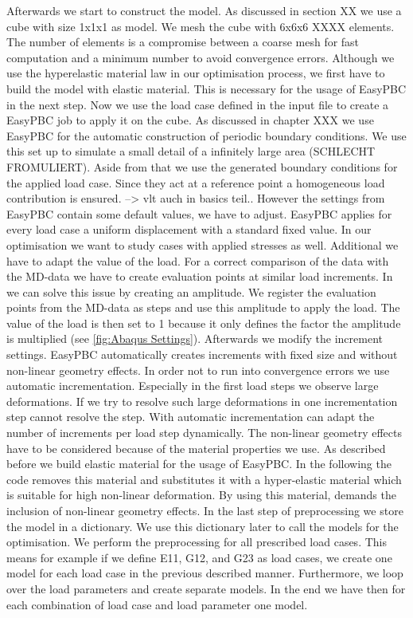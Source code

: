 Afterwards we start to construct the model. As discussed in section XX we use a cube with size 1x1x1 as model. We mesh the cube with 6x6x6 XXXX elements. The number of elements is a compromise between a coarse mesh for fast computation and a minimum number to avoid convergence errors. Although we use the hyperelastic material law in our optimisation process, we first have to build the model with elastic material. This is necessary for the usage of EasyPBC in the next step. Now we use the load case defined in the input file to create a EasyPBC job to apply it on the cube. As discussed in chapter XXX we use EasyPBC for the automatic construction of periodic boundary conditions. We use this set up to simulate a small detail of a infinitely large area (SCHLECHT FROMULIERT). Aside from that we use the generated boundary conditions for the applied load case. Since they act at a reference point a homogeneous load contribution is ensured. --> vlt auch in basics teil..
However the settings from EasyPBC contain some default values, we have to adjust. EasyPBC applies for every load case a uniform displacement with a standard fixed value. In our optimisation we want to study cases with applied stresses as well. Additional we have to adapt the value of the load. For a correct comparison of the  data with the MD-data we have to create evaluation points at similar load increments. In  we can solve this issue by creating an amplitude. We register the evaluation points from the MD-data as steps and use this amplitude to apply the load. The value of the load is then set to 1 because it only defines the factor the amplitude is multiplied (see \autoref{fig:Abaqus Settings}). Afterwards we modify the increment settings. EasyPBC automatically creates increments with fixed size and without non-linear geometry effects. In order not to run into convergence errors we use automatic incrementation. Especially in the first load steps we observe large deformations. If we try to resolve such large deformations in one incrementation step  cannot resolve the step. With automatic incrementation  can adapt the number of increments per load step dynamically. The non-linear geometry effects have to be considered because of the material properties we use. As described before we build elastic material for the usage of EasyPBC. In the following the code removes this material and substitutes it with a hyper-elastic material which is suitable for high non-linear deformation. By using this material,  demands the inclusion of non-linear geometry effects. In the last step of preprocessing we store the model in a dictionary. We use this dictionary later to call the models for the optimisation. We perform the preprocessing for all prescribed load cases. This means for example if we define E11, G12, and G23 as load cases, we create one model for each load case in the previous described manner. Furthermore, we loop over the load parameters and create separate models. In the end we have then for each combination of load case and load parameter one model. 



